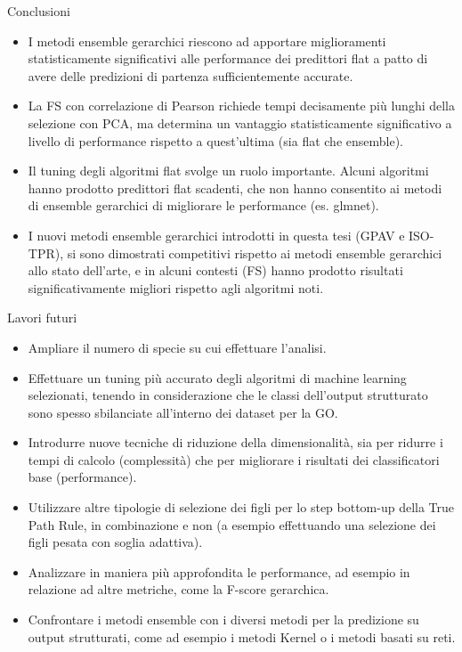 \documentclass[9pt]{beamer}
\begin{document}
\begin{tframe}{Conclusioni}
\begin{itemize}
\item I metodi ensemble gerarchici riescono ad apportare miglioramenti statisticamente significativi alle performance dei predittori flat a patto di avere delle predizioni di partenza sufficientemente accurate.
\item La FS con correlazione di Pearson richiede tempi decisamente più lunghi della selezione con PCA, ma determina un vantaggio statisticamente significativo a livello di performance rispetto a quest’ultima (sia flat che ensemble).
\item Il tuning degli algoritmi flat svolge un ruolo importante. Alcuni algoritmi hanno prodotto predittori flat scadenti, che non hanno consentito ai metodi di ensemble gerarchici di migliorare le performance (es. glmnet).
\item I nuovi metodi ensemble gerarchici introdotti in questa tesi (GPAV e ISO-TPR), si sono dimostrati competitivi rispetto ai metodi ensemble gerarchici allo stato dell’arte, e in alcuni contesti (FS) hanno prodotto risultati significativamente migliori rispetto agli algoritmi noti.
\end{itemize}
\end{tframe}
\begin{tframe}{Lavori futuri}
\begin{itemize}
\item Ampliare il numero di specie su cui effettuare l’analisi.
\item Effettuare un tuning più accurato degli algoritmi di machine learning selezionati, tenendo in considerazione che le classi dell’output strutturato sono
spesso sbilanciate all’interno dei dataset per la GO.
\item Introdurre nuove tecniche di riduzione della dimensionalità, sia per ridurre i tempi di calcolo (complessità) che per migliorare i risultati dei classificatori base (performance).
\item Utilizzare altre tipologie di selezione dei figli per lo step bottom-up della True Path Rule, in combinazione e non (a esempio effettuando una selezione
dei figli pesata con soglia adattiva).
\item Analizzare in maniera più approfondita le performance, ad esempio in relazione ad altre metriche, come la F-score gerarchica.
\item Confrontare i metodi ensemble con i diversi metodi per la predizione su
output strutturati, come ad esempio i metodi Kernel o i metodi basati su
reti.
\end{itemize}
\end{tframe}
\end{document}
